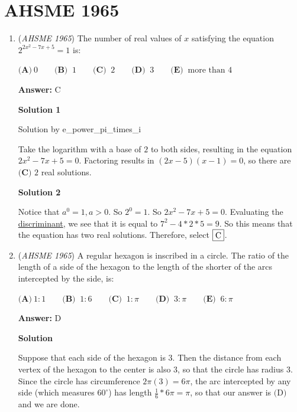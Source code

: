 \section{AHSME 1965}
        \begin{enumerate}
        	\item (\textit{AHSME 1965}) The number of real values of $x$ satisfying the equation $2^{2x^2 - 7x + 5} = 1$ is: 


 $\textbf{(A)}\ 0 \qquad  \textbf{(B) }\ 1 \qquad  \textbf{(C) }\ 2 \qquad  \textbf{(D) }\ 3 \qquad  \textbf{(E) }\ \text{more than 4}$

 \textbf{Answer: }C



\textbf{Solution 1}

Solution by e\_power\_pi\_times\_i

 Take the logarithm with a base of $2$ to both sides, resulting in the equation $2x^2-7x+5 = 0$. Factoring results in $(2x-5)(x-1) = 0$, so there are $\boxed{\textbf{(C) } 2}$ real solutions.

 



\textbf{Solution 2}

Notice that $a^0=1, a>0$. So $2^0=1$. So $2x^2-7x+5=0$. Evaluating the \href{https://artofproblemsolving.com/wiki/index.php?title=Discriminant}{discriminant}, we see that it is equal to $7^2-4*2*5=9$. So this means that the equation has two real solutions. Therefore, select $\fbox{C}$.

 


	\item (\textit{AHSME 1965}) A regular hexagon is inscribed in a circle. The ratio of the length of a side of the hexagon to the length of the 
shorter of the arcs intercepted by the side, is: 


 $\textbf{(A)}\ 1: 1 \qquad  \textbf{(B) }\ 1: 6 \qquad  \textbf{(C) }\ 1: \pi \qquad  \textbf{(D) }\ 3: \pi \qquad  \textbf{(E) }\ 6:\pi$

 \textbf{Answer: }D



\textbf{Solution}

Suppose that each side of the hexagon is $3$. Then the distance from each vertex of the hexagon to the center is also $3$, so that the circle has radius $3$. Since the circle has circumference $2\pi(3) = 6\pi$, the arc intercepted by any side (which measures $60^\circ$) has length $\frac{1}{6}*6\pi = \pi$, so that our answer is $\boxed{\text{(D)}}$ and we are done.


\end{enumerate}
